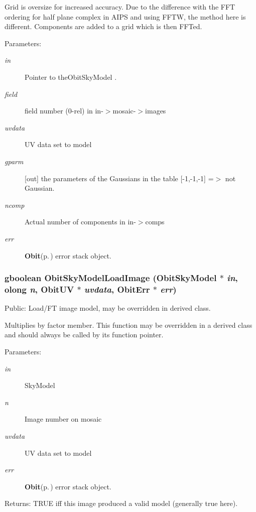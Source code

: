 Grid is oversize for increased accuracy. Due to the difference with the FFT ordering for half plane complex in AIPS and using FFTW, the method here is different. Components are added to a grid which is then FFTed. \begin{Desc}
\item[Parameters:]
\begin{description}
\item[{\em in}]Pointer to the\-Obit\-Sky\-Model . \item[{\em field}]field number (0-rel) in in-$>$mosaic-$>$images \item[{\em uvdata}]UV data set to model \item[{\em gparm}][out] the parameters of the Gaussians in the table [-1,-1,-1] =$>$ not Gaussian. \item[{\em ncomp}]Actual number of components in in-$>$comps \item[{\em err}]{\bf Obit}{\rm (p.\,\pageref{structObit})} error stack object. \end{description}
\end{Desc}
\subsubsection{\setlength{\rightskip}{0pt plus 5cm}gboolean Obit\-Sky\-Model\-Load\-Image ({\bf Obit\-Sky\-Model} $\ast$ {\em in}, {\bf olong} {\em n}, {\bf Obit\-UV} $\ast$ {\em uvdata}, {\bf Obit\-Err} $\ast$ {\em err})}\label{ObitSkyModel_8h_a64}


Public: Load/FT image model, may be overridden in derived class. 

Multiplies by factor member. This function may be overridden in a derived class and should always be called by its function pointer. \begin{Desc}
\item[Parameters:]
\begin{description}
\item[{\em in}]Sky\-Model \item[{\em n}]Image number on mosaic \item[{\em uvdata}]UV data set to model \item[{\em err}]{\bf Obit}{\rm (p.\,\pageref{structObit})} error stack object. \end{description}
\end{Desc}
\begin{Desc}
\item[Returns:]TRUE iff this image produced a valid model (generally true here). \end{Desc}
